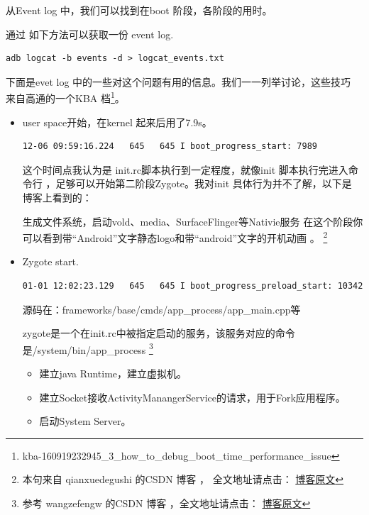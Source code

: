 从Event log 中，我们可以找到在boot 阶段，各阶段的用时。


通过 如下方法可以获取一份 event log.
\begin{lstlisting}
adb logcat -b events -d > logcat_events.txt
\end{lstlisting}


下面是evet log 中的一些对这个问题有用的信息。我们一一列举讨论，这些技巧
来自高通的一个KBA 档\footnote{kba-160919232945\_3\_how\_to\_debug\_boot\_time\_performance\_issue}。


\begin{itemize}

\item  user space开始，在kernel 起来后用了7.9s。
\begin{lstlisting}
12-06 09:59:16.224   645   645 I boot_progress_start: 7989
\end{lstlisting}

这个时间点我认为是 init.rc脚本执行到一定程度，就像init 脚本执行完进入命令行
，足够可以开始第二阶段Zygote。我对init 具体行为并不了解，以下是 博客上看到的：


生成文件系统，启动vold、media、SurfaceFlinger等Nativie服务
在这个阶段你可以看到带“Android”文字静态logo和带“android”文字的开机动画 。
\footnote{本句来自 qianxuedegushi 的CSDN 博客 ，
全文地址请点击： \href{https://blog.csdn.net/qianxuedegushi/article/details/75174650?utm_source=copy}{博客原文} }






\item Zygote start.

\begin{lstlisting}
01-01 12:02:23.129   645   645 I boot_progress_preload_start: 10342
\end{lstlisting}



源码在：frameworks/base/cmds/app\_process/app\_main.cpp等

zygote是一个在init.rc中被指定启动的服务，该服务对应的命令是/system/bin/app\_process \footnote{参考 wangzefengw 的CSDN 博客 ，全文地址请点击：
\href{https://blog.csdn.net/wan2g/article/details/80949972?utm_source=copy}{博客原文}} 

\begin{itemize}
\item 建立java Runtime，建立虚拟机。
\item 建立Socket接收ActivityManangerService的请求，用于Fork应用程序。
\item 启动System Server。
\end{itemize}





\end{itemize}
